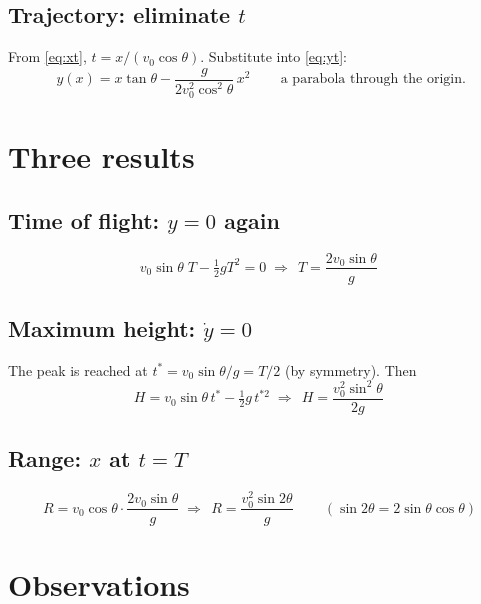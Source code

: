 \documentclass[10pt]{article}
\begin{document}
\subsection*{Trajectory: eliminate $t$}
From \eqref{eq:xt}, $t = x/(v_0\cos\theta)$. Substitute into \eqref{eq:yt}:
\begin{equation}
  \boxed{\,y(x) = x\tan\theta - \frac{g}{2 v_0^2\cos^2\theta}\,x^2\,}
  \qquad\text{a parabola through the origin.}
  \label{eq:traj}
\end{equation}

\section{Three results}

\subsection*{Time of flight: $y = 0$ again}
\begin{equation}
  v_0\sin\theta\; T - \tfrac{1}{2} g T^2 = 0
  \;\Longrightarrow\;
  \boxed{\,T = \frac{2 v_0\sin\theta}{g}\,}
  \label{eq:T}
\end{equation}

\subsection*{Maximum height: $\dot{y} = 0$}
The peak is reached at $t^\ast = v_0\sin\theta/g = T/2$ (by symmetry). Then
\begin{equation}
  H = v_0\sin\theta\, t^\ast - \tfrac{1}{2} g\, t^{\ast 2}
  \;\Longrightarrow\;
  \boxed{\,H = \frac{v_0^2\sin^2\theta}{2g}\,}
  \label{eq:H}
\end{equation}

\subsection*{Range: $x$ at $t = T$}
\begin{equation}
  R = v_0\cos\theta\cdot\frac{2 v_0\sin\theta}{g}
  \;\Longrightarrow\;
  \boxed{\,R = \frac{v_0^2\sin 2\theta}{g}\,}
  \qquad (\sin 2\theta = 2\sin\theta\cos\theta)
  \label{eq:R}
\end{equation}

\section{Observations}
\end{document}
